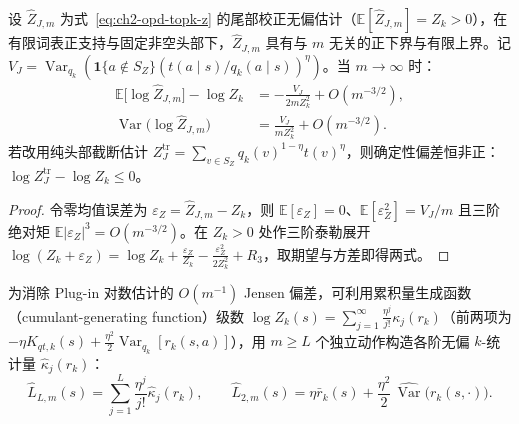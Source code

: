 \documentclass[lang=cn,scheme=chinese,openany]{elegantbook}
\newcommand{\E}{\mathbb E}
\newcommand{\Var}{\operatorname{Var}}
\begin{document}
\begin{theorem}
\label{thm:ch2-opd-logz-delta}
设 $\widehat Z_{J,m}$ 为式~\eqref{eq:ch2-opd-topk-z} 的尾部校正无偏估计（$\mathbb E[\widehat Z_{J,m}]=Z_k>0$），在有限词表正支持与固定非空头部下，$\widehat Z_{J,m}$ 具有与 $m$ 无关的正下界与有限上界。记 $V_{J}=\operatorname{Var}_{q_k}(\mathbf 1\{a\notin S_Z\} (t(a\mid s)/q_k(a\mid s))^\eta)$。当 $m\to\infty$ 时：
\begin{align}
\mathbb E\bigl[\log\widehat Z_{J,m}\bigr]-\log Z_k
&=-\frac{V_J}{2mZ_k^2}+O(m^{-3/2}),\\
\operatorname{Var}\bigl(\log\widehat Z_{J,m}\bigr)
&=\frac{V_J}{mZ_k^2}+O(m^{-3/2}).
\end{align}
若改用纯头部截断估计 $Z_J^{\mathrm{tr}}=\sum_{v\in S_Z} q_k(v)^{1-\eta}t(v)^\eta$，则确定性偏差恒非正：$\log Z_J^{\mathrm{tr}}-\log Z_k\le 0$。
\end{theorem}
\begin{proof}
令零均值误差为 $\varepsilon_Z=\widehat Z_{J,m}-Z_k$，则 $\E[\varepsilon_Z]=0$、$\E[\varepsilon_Z^2]=V_J/m$ 且三阶绝对矩 $\E|\varepsilon_Z|^3=O(m^{-3/2})$。在 $Z_k>0$ 处作三阶泰勒展开 $\log(Z_k+\varepsilon_Z)=\log Z_k+\frac{\varepsilon_Z}{Z_k}-\frac{\varepsilon_Z^2}{2Z_k^2}+R_3$，取期望与方差即得两式。
\end{proof}

为消除 Plug-in 对数估计的 $O(m^{-1})$ Jensen 偏差，可利用累积量生成函数（cumulant-generating function）级数 $\log Z_k(s)=\sum_{j=1}^\infty\frac{\eta^j}{j!}\kappa_j(r_k)$（前两项为 $-\eta K_{qt,k}(s)+\frac{\eta^2}{2}\Var_{q_k}[r_k(s,a)]$），用 $m\ge L$ 个独立动作构造各阶无偏 $k$-统计量 $\widehat\kappa_j(r_k)$：
\begin{equation}
\widehat L_{L,m}(s)=\sum_{j=1}^{L}\frac{\eta^j}{j!}\widehat\kappa_j(r_k),
\qquad
\widehat L_{2,m}(s)=\eta\bar r_k(s)+\frac{\eta^2}{2}\,\widehat{\operatorname{Var}}\bigl(r_k(s,\cdot)\bigr).
\label{eq:ch2-opd-z-cumulant-start,eq:ch2-opd-logz-cumulant-series,eq:ch2-opd-logz-second-order,eq:ch2-opd-logz-kl-expansion,eq:ch2-opd-logz-kstat-estimator,eq:ch2-opd-logz-second-estimator}
\end{equation}
\end{document}
